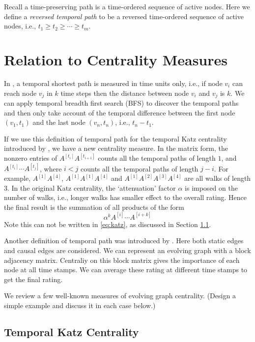 \documentclass[12pt]{article}
\theoremstyle{definition}
\begin{document}
Recall a time-preserving path is a time-ordered sequence of active nodes. Here we define a \emph{reversed temporal path} to be a reversed time-ordered sequence of active nodes, i.e.,
$t_1 \ge t_2 \ge \cdots \ge t_m$.


\section{Relation to Centrality Measures}
\label{sec:topol-temp-flow}

In \cite{tang10s}, a temporal shortest path is measured in time units only, i.e., if node
$v_i$ can reach node $v_j$ in $k$ time steps then the distance between node
$v_i$ and $v_j$ is $k$. We can apply temporal breadth first
search (BFS) \cite{chen16} to discover the temporal paths and then only take account of the temporal difference between the first node $(v_1, t_1)$ and the last node $(v_n, t_n)$, i.e., $t_n - t_1$.

If we use this definition of temporal path for the temporal Katz centrality introduced by
\cite{grindrod11}, we have a new centrality measure.
In the matrix form, the nonzero entries of $A^{[t_i]} A^{[t_{i+1}]}$ counts all the temporal paths of length $1$, and
$A^{[t_i]}\cdots A^{[t_j]}$, where $i < j$ counts all the temporal paths of length $j -i$.
For example, $A^{[1]}A^{[4]}$, $A^{[1]}A^{[1]}A^{[4]}$ and $A^{[1]}A^{[2]}A^{[3]}A^{[4]}$ are all walks of length 3.
In the original Katz centrality, the `attenuation' factor $\alpha$ is imposed on the
number of walks, i.e., longer walks has smaller effect to the overall rating.
Hence the final result is the summation of all products of the form
\[
\alpha^k A^{[i]} \cdots A^{[i+k]}
\]
Note this can not be written in \eqref{eq:katz}, as discussed in Section \ref{sec:temp-katz-centr}.


Another definition of temporal path was introduced by \cite{chen16}. Here
both static edges and causal edges are considered. We can represent an evolving graph with a block adjacency matrix. Centraliy on this block matrix gives the importance of each node at all time stamps. We can average these rating at different time stamps to
get the final rating.


We review a few well-known measures of evolving graph centrality.
(Design a simple example and discuss it in each case below.)
\subsection{Temporal Katz Centrality}
\label{sec:temp-katz-centr}
\end{document}
